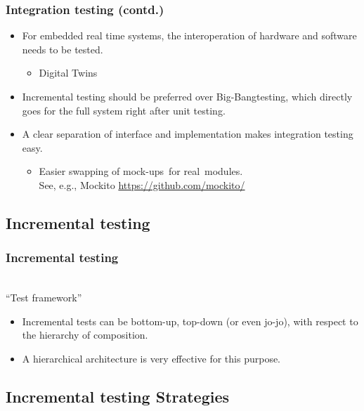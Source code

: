 \begin{frame}
\frametitle{Integration testing (contd.)}
\begin{itemize}
  \item For embedded real time systems, the interoperation of hardware and software needs to be tested.
	\begin{itemize}
		\item Digital Twins
	\end{itemize}
  \item Incremental testing should be preferred over \glq Big-Bang\grq testing, which directly goes for the full system right after unit testing.
  \item A clear separation of interface and implementation makes integration testing easy.
    \begin{itemize}
      \item Easier swapping of \glq mock-ups\grq\ for \glq real\grq\ modules.\\
			See, e.g., Mockito \url{https://github.com/mockito/}
    \end{itemize}
\end{itemize}
\end{frame}


\subsection{Incremental testing}

\begin{frame}
\frametitle{Incremental testing}
\begin{center}
\\
"`Test framework"'
\end{center}
 
\begin{itemize}
	\item Incremental tests can be bottom-up, top-down (or even jo-jo), with respect to the hierarchy of composition.
	\item A hierarchical architecture is very effective for this purpose.
\end{itemize}

\end{frame}


\subsection{Incremental testing Strategies}


